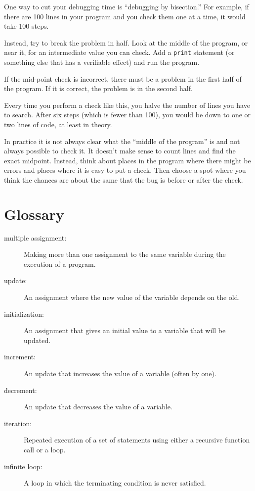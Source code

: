 \documentclass[10pt]{book}
\begin{document}
One way to cut your debugging time is ``debugging by bisection.''
For example, if there are 100 lines in your program and you
check them one at a time, it would take 100 steps.

Instead, try to break the problem in half.  Look at the middle
of the program, or near it, for an intermediate value you
can check.  Add a {\tt print} statement (or something else
that has a verifiable effect) and run the program.

If the mid-point check is incorrect, there must be a problem in the
first half of the program.  If it is correct, the problem is
in the second half.

Every time you perform a check like this, you halve the number of
lines you have to search.  After six steps (which is fewer than 100),
you would be down to one or two lines of code, at least in theory.

In practice it is not always clear what
the ``middle of the program'' is and not always possible to
check it.  It doesn't make sense to count lines and find the
exact midpoint.  Instead, think about places
in the program where there might be errors and places where it
is easy to put a check.  Then choose a spot where you
think the chances are about the same that the bug is before
or after the check.




\section{Glossary}

\begin{description}

\item[multiple assignment:] Making more than one assignment to the same
variable during the execution of a program.

\item[update:] An assignment where the new value of the variable
depends on the old.

\item[initialization:] An assignment that gives an initial value to
a variable that will be updated.

\item[increment:] An update that increases the value of a variable
(often by one).

\item[decrement:] An update that decreases the value of a variable.

\item[iteration:] Repeated execution of a set of statements using
either a recursive function call or a loop.

\item[infinite loop:] A loop in which the terminating condition is
never satisfied.

\end{description}
\end{document}
